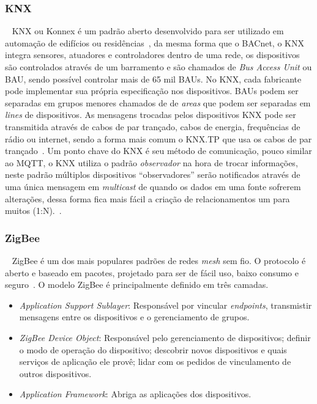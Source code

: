 \subsubsection{KNX}
~\label{sec:knx}
KNX ou Konnex é um padrão aberto desenvolvido para ser utilizado em automação de edifícios ou residências~\cite{Sapundzhi2020},
da mesma forma que o BACnet, o KNX integra sensores, atuadores e controladores dentro de uma rede, os dispositivos são controlados
através de um barramento e são chamados de \emph{Bus Access Unit} ou BAU, sendo possível controlar mais de 65 mil BAUs.
No KNX, cada fabricante pode implementar sua própria especificação nos dispositivos. BAUs podem ser separadas em grupos menores
chamados de de \emph{areas} que podem ser separadas em \emph{lines} de dispositivos. As mensagens trocadas pelos dispositivos KNX
pode ser transmitida através de cabos de par trançado, cabos de energia, frequências de rádio ou internet, sendo a forma mais comum o
KNX.TP que usa os cabos de par trançado~\cite{Kraus2020}.
Um ponto chave do KNX é seu método de comunicação, pouco similar ao MQTT, o KNX utiliza o padrão \emph{observador} na hora de trocar informações,
neste padrão múltiplos dispositivos ``observadores'' serão notificados através de uma única mensagem em \emph{multicast}
de quando os dados em uma fonte sofrerem alterações, dessa forma fica mais fácil a criação de relacionamentos um para muitos (1:N).~\cite{Domingues2016}. 

\subsubsection{ZigBee}
~\label{sec:zigbee}
ZigBee é um dos mais populares padrões de redes \emph{mesh} sem fio. O protocolo é aberto e baseado em pacotes, projetado para ser de fácil uso,
baixo consumo e seguro~\cite{tomar2011}.
O modelo ZigBee é principalmente definido em três camadas.
\begin{itemize}
    \item \emph{Application Support Sublayer}: Responsável por vincular \emph{endpoints}, transmistir mensagens entre os dispositivos e o gerenciamento de grupos.
    \item \emph{ZigBee Device Object}: Responsável pelo gerenciamento de dispositivos; definir o modo de operação do dispositivo; descobrir novos dispositivos e quais serviços de aplicação ele provê; lidar com os pedidos de vinculamento de outros dispositivos.
    \item \emph{Application Framework}: Abriga as aplicações dos dispositivos. 
\end{itemize}
~\cite{Domingues2016}


